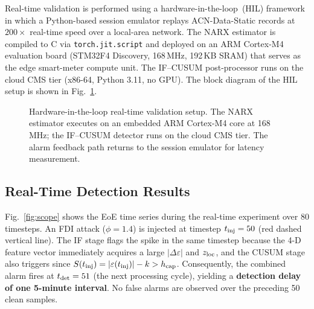 \documentclass[journal]{IEEEtran}
\begin{document}
Real-time validation is performed using a hardware-in-the-loop~(HIL)
framework in which a Python-based session emulator replays
ACN-Data-Static records at $200\times$ real-time speed over
a local-area network.
The NARX estimator is compiled to C via \texttt{torch.jit.script}
and deployed on an ARM Cortex-M4 evaluation board (STM32F4
Discovery, 168\,MHz, 192\,KB SRAM) that serves as the
edge smart-meter compute unit.
The IF--CUSUM post-processor runs on the cloud CMS tier
(x86-64, Python 3.11, no GPU).
The block diagram of the HIL setup is shown in Fig.~\ref{fig:hil}.

\begin{figure}[!t]
\centering
{}
\caption{Hardware-in-the-loop real-time validation setup.
  The NARX estimator executes on an embedded ARM Cortex-M4 core
  at 168\,MHz; the IF--CUSUM detector runs on the cloud CMS tier.
  The alarm feedback path returns to the session emulator for
  latency measurement.}
\label{fig:hil}
\end{figure}

\subsection{Real-Time Detection Results}

Fig.~\ref{fig:scope} shows the EoE time series during the
real-time experiment over 80 timesteps.
An FDI attack ($\phi=1.4$) is injected at timestep
$t_{\rm inj}=50$ (red dashed vertical line).
The IF stage flags the spike in the same timestep because the
4-D feature vector immediately acquires a large $|\Delta\varepsilon|$
and $z_{\rm loc}$, and the CUSUM stage also triggers since
$S(t_{\rm inj}) = |\varepsilon(t_{\rm inj})| - k > h_{\rm cap}$.
Consequently, the combined alarm fires at $t_{\rm det}=51$
(the next processing cycle), yielding a
\textbf{detection delay of one 5-minute interval}.
No false alarms are observed over the preceding 50 clean samples.
\end{document}
